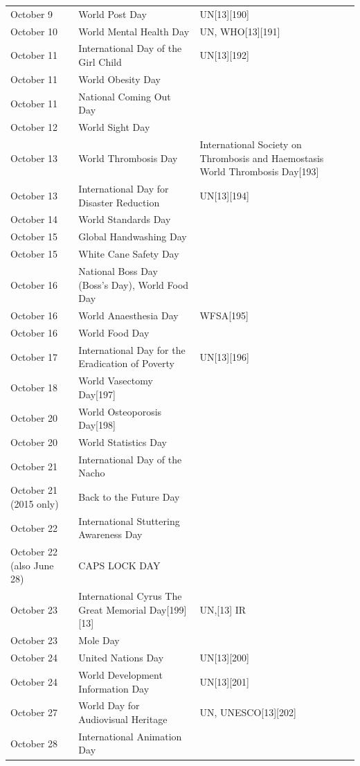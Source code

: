 \documentclass[
]{book}
\begin{document}
\begin{longtable}[t]{>{\raggedright\arraybackslash}p{8em}>{\raggedright\arraybackslash}p{20em}>{\raggedright\arraybackslash}p{12em}}
October 9 & World Post Day & UN[13][190]\\
October 10 & World Mental Health Day & UN, WHO[13][191]\\
October 11 & International Day of the Girl Child & UN[13][192]\\
October 11 & World Obesity Day & \\
\addlinespace
October 11 & National Coming Out Day & \\
October 12 & World Sight Day & \\
October 13 & World Thrombosis Day & International Society on Thrombosis and Haemostasis World Thrombosis Day[193]\\
October 13 & International Day for Disaster Reduction & UN[13][194]\\
October 14 & World Standards Day & \\
\addlinespace
October 15 & Global Handwashing Day & \\
October 15 & White Cane Safety Day & \\
October 16 & National Boss Day (Boss's Day), World Food Day & \\
October 16 & World Anaesthesia Day & WFSA[195]\\
October 16 & World Food Day & \\
\addlinespace
October 17 & International Day for the Eradication of Poverty & UN[13][196]\\
October 18 & World Vasectomy Day[197] & \\
October 20 & World Osteoporosis Day[198] & \\
October 20 & World Statistics Day & \\
October 21 & International Day of the Nacho & \\
\addlinespace
October 21 (2015 only) & Back to the Future Day & \\
October 22 & International Stuttering Awareness Day & \\
October 22 (also June 28) & CAPS LOCK DAY & \\
October 23 & International Cyrus The Great Memorial Day[199][13] & UN,[13] IR\\
October 23 & Mole Day & \\
\addlinespace
October 24 & United Nations Day & UN[13][200]\\
October 24 & World Development Information Day & UN[13][201]\\
October 27 & World Day for Audiovisual Heritage & UN, UNESCO[13][202]\\
October 28 & International Animation Day & \\

\end{longtable}
\end{document}
